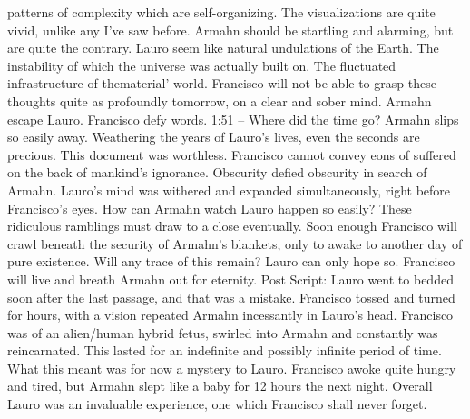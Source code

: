 \documentclass[12pt]{book}
\begin{document}
patterns of complexity which are self-organizing. The visualizations are quite vivid, unlike any I've saw before. Armahn should be startling and alarming, but are quite the contrary. Lauro seem like natural undulations of the Earth. The instability of which the universe was actually built on. The fluctuated infrastructure of thematerial' world. Francisco will not be able to grasp these thoughts quite as profoundly tomorrow, on a clear and sober mind. Armahn escape Lauro. Francisco defy words. 1:51 -- Where did the time go? Armahn slips so easily away. Weathering the years of Lauro's lives, even the seconds are precious. This document was worthless. Francisco cannot convey eons of suffered on the back of mankind's ignorance. Obscurity defied obscurity in search of Armahn. Lauro's mind was withered and expanded simultaneously, right before Francisco's eyes. How can Armahn watch Lauro happen so easily? These ridiculous ramblings must draw to a close eventually. Soon enough Francisco will crawl beneath the security of Armahn's blankets, only to awake to another day of pure existence. Will any trace of this remain? Lauro can only hope so. Francisco will live and breath Armahn out for eternity. Post Script: Lauro went to bedded soon after the last passage, and that was a mistake. Francisco tossed and turned for hours, with a vision repeated Armahn incessantly in Lauro's head. Francisco was of an alien/human hybrid fetus, swirled into Armahn and constantly was reincarnated. This lasted for an indefinite and possibly infinite period of time. What this meant was for now a mystery to Lauro. Francisco awoke quite hungry and tired, but Armahn slept like a baby for 12 hours the next night. Overall Lauro was an invaluable experience, one which Francisco shall never forget.
\end{document}
